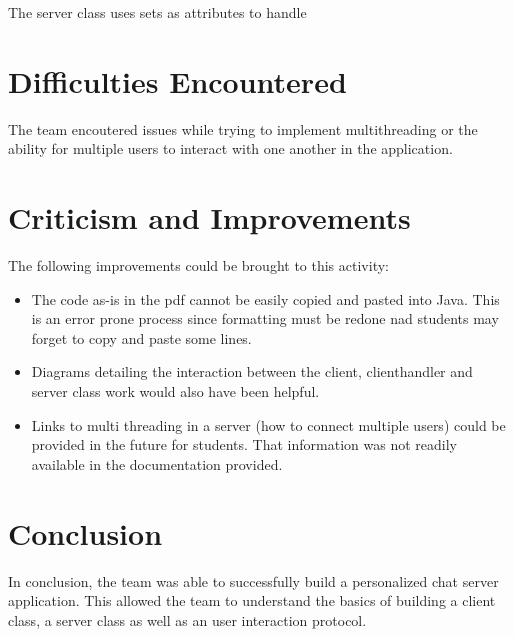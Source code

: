 \documentclass[11pt,letterpaper]{article}
\begin{document}
\medskip

The server class uses sets as attributes to handle

\section{Difficulties Encountered}
The team encoutered issues while trying to implement multithreading or the ability for multiple users to interact with one another in the application.


\section{Criticism and Improvements}
The following improvements could be brought to this activity:
\begin{itemize}
  \item The code as-is in the pdf cannot be easily copied and pasted into Java. This is an error prone process since formatting must be redone nad students may forget to copy and paste some lines.
  \item Diagrams detailing the interaction between the client, clienthandler and server class work would also have been helpful.
  \item Links to multi threading in a server (how to connect multiple users) could be provided in the future for students. That information was not readily available in the documentation provided.
\end{itemize}

\section{Conclusion}
In conclusion, the team was able to successfully build a personalized chat server application. This allowed the team to understand the basics of building a client class, a server class as well as an user interaction protocol.
\end{document}
